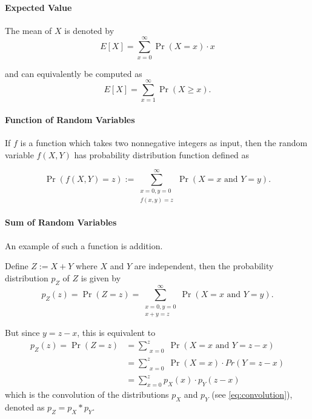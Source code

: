 \documentclass{masterthesis}
\begin{document}
\paragraph*{Expected Value}
The mean of $X$ is denoted by 
\begin{equation}\label{eq:expectation}
    E[X] = \sum_{x=0}^{\infty} \Pr(X = x) \cdot x
\end{equation}

and can equivalently be computed as 
\begin{equation}
    E[X] = \sum_{x=1}^{\infty} \Pr(X \geq x).
\end{equation}

\paragraph*{Function of Random Variables}\label{paragraph:function_of_random_variables}
If $f$ is a function which takes two nonnegative integers as input, then the random variable $f(X, Y)$ has probability distribution function defined as

\begin{equation}
    \Pr(f(X, Y) = z) := \sum_{\substack{x=0, y=0 \\ f(x,y)=z}}^{\infty} \Pr(X = x \text{ and } Y = y).
\end{equation}

\paragraph*{Sum of Random Variables}\label{paragraph:sum_of_random_variables}
An example of such a function is addition. 

Define $Z := X+Y$ where $X$ and $Y$ are independent, then the probability distribution $p_Z$ of $Z$ is given by 
\begin{equation}
    p_Z(z) = \Pr(Z = z) = \sum_{\substack{x=0, y=0 \\ x+y=z}}^{\infty} \Pr(X = x \text{ and } Y = y).
\end{equation}

But since $y = z - x$, this is equivalent to
\begin{align}
    p_Z(z) = \Pr(Z = z) &= \sum_{\substack{x=0}}^{z} \Pr(X = x \text{ and } Y = z - x) \\ 
                        &= \sum_{\substack{x=0}}^{z} \Pr(X = x) \cdot Pr(Y = z - x) \\
                        &= \sum_{x=0}^{z} p_X(x) \cdot p_Y (z - x)
\end{align}
which is the convolution of the distributions $p_X$ and $p_Y$ (see \ref{eq:convolution}), denoted as $p_Z = p_X * p_Y$.
\end{document}
